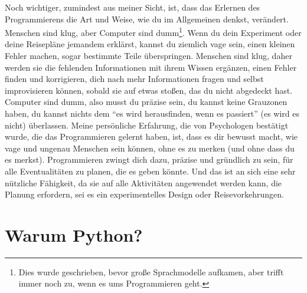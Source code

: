 \documentclass[
]{book}
\begin{document}
Noch wichtiger, zumindest aus meiner Sicht, ist, dass das Erlernen des Programmierens die Art und Weise, wie du im Allgemeinen denkst, verändert. Menschen sind klug, aber Computer sind dumm\footnote{Dies wurde geschrieben, bevor große Sprachmodelle aufkamen, aber trifft immer noch zu, wenn es ums Programmieren geht.}. Wenn du dein Experiment oder deine Reisepläne jemandem erklärst, kannst du ziemlich vage sein, einen kleinen Fehler machen, sogar bestimmte Teile überspringen. Menschen sind klug, daher werden sie die fehlenden Informationen mit ihrem Wissen ergänzen, einen Fehler finden und korrigieren, dich nach mehr Informationen fragen und selbst improvisieren können, sobald sie auf etwas stoßen, das du nicht abgedeckt hast. Computer sind dumm, also musst du präzise sein, du kannst keine Grauzonen haben, du kannst nichts dem ``es wird herausfinden, wenn es passiert'' (es wird es nicht) überlassen. Meine persönliche Erfahrung, die von Psychologen bestätigt wurde, die das Programmieren gelernt haben, ist, dass es dir bewusst macht, wie vage und ungenau Menschen sein können, ohne es zu merken (und ohne dass du es merkst). Programmieren zwingt dich dazu, präzise und gründlich zu sein, für alle Eventualitäten zu planen, die es geben könnte. Und das ist an sich eine sehr nützliche Fähigkeit, da sie auf alle Aktivitäten angewendet werden kann, die Planung erfordern, sei es ein experimentelles Design oder Reisevorkehrungen.

\hypertarget{warum-python}{%
\section{Warum Python?}\label{warum-python}}
\end{document}
